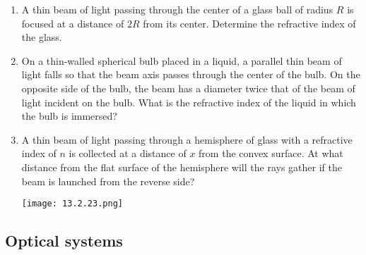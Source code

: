 \documentclass{article}
\begin{document}
\begin{enumerate}[label=13.2.\arabic*]
\item A thin beam of light passing through the center of a glass ball of radius $R$ is focused at a distance of $2R$ from its center. Determine the refractive index of the glass.

\item  On a thin-walled spherical bulb placed in a liquid, a parallel thin beam of light falls so that the beam axis passes through the center of the bulb. On the opposite side of the bulb, the beam has a diameter twice that of the beam of light incident on the bulb. What is the refractive index of the liquid in which the bulb is immersed?

\item A thin beam of light passing through a hemisphere of glass with a refractive index of $n$ is collected at a distance of $x$ from the convex surface. At what distance from the flat surface of the hemisphere will the rays gather if the beam is launched from the reverse side?

\begin{center}
    \texttt{[image: 13.2.23.png]}
\end{center}

\end{enumerate}
\subsection{Optical systems}
\end{document}
